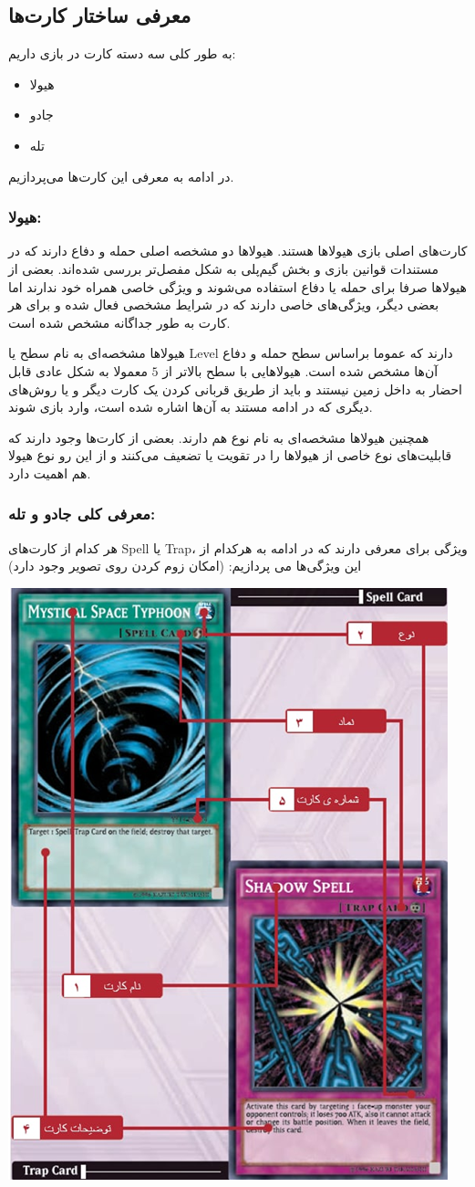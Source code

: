 \documentclass[]{article}
\begin{document}
\subsection*{{\titr معرفی ساختار کارت‌ها}}

به طور کلی سه دسته کارت در بازی داریم:
\begin{itemize}
	\item
	هیولا
	\item
	جادو
	
	\item
	تله
\end{itemize}

در ادامه به معرفی این کارت‌ها می‌پردازیم.

\subsubsection*{{\titr هیولا:}}
کارت‌های اصلی بازی هیولاها هستند. هیولاها دو مشخصه اصلی حمله و دفاع دارند که در مستندات قوانین بازی و بخش گیم‌پلی به شکل مفصل‌تر بررسی شده‌اند. بعضی از هیولاها صرفا برای حمله یا دفاع استفاده می‌شوند و ویژگی خاصی همراه خود ندارند اما بعضی دیگر، ویژگی‌های خاصی دارند که در شرایط مشخصی فعال شده و برای هر کارت به طور جداگانه مشخص شده است.

هیولاها مشخصه‌ای به نام سطح یا Level دارند که عموما براساس سطح حمله و دفاع آن‌ها مشخص شده است. هیولاهایی با سطح بالاتر از $5$ معمولا به شکل عادی قابل احضار به داخل زمین نیستند و باید از طریق قربانی کردن یک کارت دیگر و یا روش‌های دیگری که در ادامه مستند به آن‌ها اشاره شده است، وارد بازی شوند.

همچنین هیولاها مشخصه‌ای به نام نوع هم دارند. بعضی از کارت‌ها وجود دارند که قابلیت‌های نوع خاصی از هیولاها را در تقویت یا تضعیف می‌کنند و از این رو نوع هیولا هم اهمیت دارد.




\subsubsection*{{\titr معرفی کلی جادو و تله:}}

هر کدام از کارت‌های Spell یا Trap، ویژگی برای معرفی دارند که در ادامه به هرکدام از این ویژگی‌ها می پردازیم: (امکان زوم کردن روی تصویر وجود دارد)



\begin{center}
	\includegraphics[width = 0.25 \textwidth]{Resources/st.png}
	
\end{center}
\end{document}
